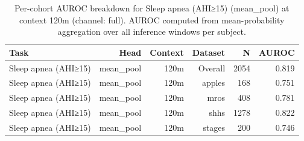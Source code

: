 \begin{table}[ht]
\centering
\caption{Per-cohort AUROC breakdown for Sleep apnea (AHI≥15) (mean_pool) at context 120m (channel: full). AUROC computed from mean-probability aggregation over all inference windows per subject.}
\label{tab:cohort_apnea_binary_mean_pool_full}
\begin{tabular}{lrrrrr}
\toprule
Task & Head & Context & Dataset & N & AUROC \\
\midrule
Sleep apnea (AHI≥15) & mean_pool & 120m & Overall & 2054 & 0.819 \\
Sleep apnea (AHI≥15) & mean_pool & 120m & apples & 168 & 0.751 \\
Sleep apnea (AHI≥15) & mean_pool & 120m & mros & 408 & 0.781 \\
Sleep apnea (AHI≥15) & mean_pool & 120m & shhs & 1278 & 0.822 \\
Sleep apnea (AHI≥15) & mean_pool & 120m & stages & 200 & 0.746 \\
\bottomrule
\end{tabular}
\end{table}